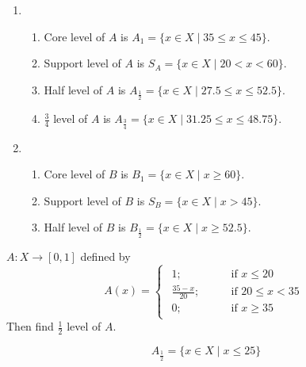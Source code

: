 \documentclass[../main-sheet.tex]{subfiles}
\begin{document}
\begin{soln}\hfill
    \begin{enumerate}
        \item \begin{enumerate}
            \item Core level of \(A \) is \(A_1=\{x\in X\mid 35\leq x\leq45\}\).
            \item Support level of \(A \) is \(S_A=\{x\in X\mid 20<x<60\}\).
            \item Half level of \(A \) is \(A_{\frac{1}{2}}=\{x\in X\mid 27.5\leq x\leq52.5\}\).
            \item \(\frac{3}{4}\) level of \(A \) is \(A_{\frac{3}{4}}=\{x\in X\mid 31.25\leq x\leq48.75\}\).
        \end{enumerate}
        \item \begin{enumerate}
            \item Core level of \(B \) is \(B_1=\{x\in X\mid x\geq 60\}\).
            \item Support level of \(B \) is \(S_B=\{x\in X\mid x>45\}\).
            \item Half level of \(B \) is \(B_{\frac{1}{2}}=\{x\in X\mid x\geq52.5\}\).
        \end{enumerate}
    \end{enumerate}
\end{soln}
\begin{ex}
    \(A:X\to [0,1]\) defined by 
    \[
        A(x)=\begin{cases}
            \begin{aligned}
                1; \qquad&\text{if } x\leq20\\
                \frac{35-x}{20}; \qquad&\text{if }20\leq x <35\\
                0; \qquad&\text{if }x\geq35
            \end{aligned}
    \end{cases}
    \]
    Then find \(\frac{1}{2}\) level of \(A \).
\end{ex}
\begin{soln}
    \[A_\frac{1}{2}=\{x\in X\mid x\leq 25\}\]
\end{soln}
\end{document}
